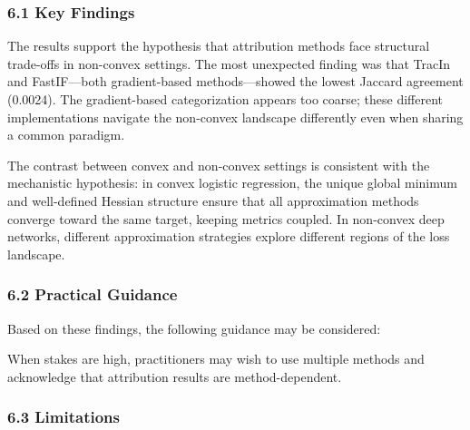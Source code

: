 
\subsubsection{6.1 Key Findings}

The results support the hypothesis that attribution methods face structural trade-offs in non-convex settings. The most unexpected finding was that TracIn and FastIF---both gradient-based methods---showed the lowest Jaccard agreement (0.0024). The gradient-based categorization appears too coarse; these different implementations navigate the non-convex landscape differently even when sharing a common paradigm.

The contrast between convex and non-convex settings is consistent with the mechanistic hypothesis: in convex logistic regression, the unique global minimum and well-defined Hessian structure ensure that all approximation methods converge toward the same target, keeping metrics coupled. In non-convex deep networks, different approximation strategies explore different regions of the loss landscape.

\subsubsection{6.2 Practical Guidance}

Based on these findings, the following guidance may be considered:

\begin{table}[htbp]
\centering
{}
\end{table}

When stakes are high, practitioners may wish to use multiple methods and acknowledge that attribution results are method-dependent.

\subsubsection{6.3 Limitations}

